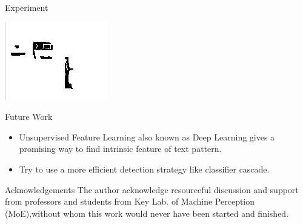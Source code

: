 \documentclass[a0paper,portrait]{baposter}
\begin{document}
\begin{poster}
\begin{posterbox}[name=experiment,column=2,below = example]{Experiment}
\begin{center}
  \includegraphics[width=1\headerheight]{ex32.jpg}
  \label{fig:figlabel}
\end{center}

\end{posterbox}








\begin{posterbox}[name=future,column=2,below=experiment]{Future Work}
  \begin{itemize}
    \item Unsupervised Feature Learning also known as Deep Learning gives a promising way to find intrinsic feature of text pattern.
    \item Try to use a more efficient detection strategy like classifier cascade.
  \end{itemize}
\end{posterbox}











\begin{posterbox}[name=ackn,column=2,below=future,above=bottom]{Acknowledgements}
The author acknowledge resourceful discussion and support from professors and students from Key Lab. of Machine Perception (MoE),without whom this work would never have been started and finished.

\end{posterbox}

\end{poster}
\end{document}
